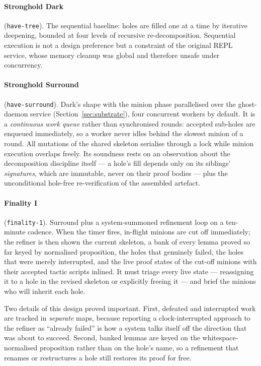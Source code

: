 \documentclass[12pt, a4paper]{article}
\begin{document}
\paragraph{Stronghold Dark} (\texttt{have-tree}). The sequential baseline:
holes are filled one at a time by iterative deepening, bounded at four
levels of recursive re-decomposition. Sequential execution is not a design
preference but a constraint of the original REPL service, whose memory
cleanup was global and therefore unsafe under concurrency.

\paragraph{Stronghold Surround} (\texttt{have-surround}). Dark's shape with
the minion phase parallelised over the ghost-daemon service
(Section~\ref{sec:substrate}), four concurrent workers by default. It is a
\emph{continuous work queue} rather than synchronised rounds: accepted
sub-holes are enqueued immediately, so a worker never idles behind the
slowest minion of a round. All mutations of the shared skeleton serialise
through a lock while minion execution overlaps freely. Its soundness rests
on an observation about the decomposition discipline itself --- a hole's fill
depends only on its siblings' \emph{signatures}, which are immutable, never
on their proof bodies --- plus the unconditional hole-free re-verification of
the assembled artefact.

\paragraph{Finality I} (\texttt{finality-1}). Surround plus a
system-summoned refinement loop on a ten-minute cadence. When the timer
fires, in-flight minions are cut off immediately; the refiner is then shown
the current skeleton, a bank of every lemma proved so far keyed by
normalised proposition, the holes that genuinely failed, the holes that were
merely interrupted, and the live proof states of the cut-off minions with
their accepted tactic scripts inlined. It must triage every live state ---
reassigning it to a hole in the revised skeleton or explicitly freeing it ---
and brief the minions who will inherit each hole.

Two details of this design proved important. First, defeated and interrupted
work are tracked in \emph{separate} maps, because reporting a
clock-interrupted approach to the refiner as ``already failed'' is how a
system talks itself off the direction that was about to succeed. Second,
banked lemmas are keyed on the whitespace-normalised proposition rather than
on the hole's name, so a refinement that renames or restructures a hole
still restores its proof for free.
\end{document}
